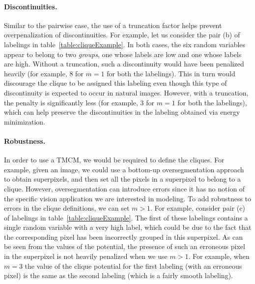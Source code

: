 \documentclass[10pt,letterpaper]{article}
\newcommand{\myparagraph}[1]{\vspace{0mm}\paragraph{#1}}
\begin{document}
\myparagraph{\bf Discontinuities.} Similar to the pairwise case, the use of a truncation factor helps prevent overpenalization of discontinuities. For example,
let us consider the pair (b) of labelings in table~\ref{table:cliqueExample}. In both cases, the six random variables appear to belong to two
{\em groups}, one whose labels are low and one whose labels are high. Without a truncation, such a discontinuity would have been penalized heavily (for example,
8 for $m=1$ for both the labelings). This in turn would discourage the clique to be assigned this labeling even though this type of discontinuity is expected
to occur in natural images. However, with a truncation, the penalty is significantly less (for example, 3 for $m=1$ for both the labelings), which can help
preserve the discontinuities in the labeling obtained via energy minimization.
\vspace{-1mm}

\myparagraph{\bf Robustness.} In order to use a TMCM, we would be required to define the cliques. For example, given an image, we could use a bottom-up oversegmentation
approach to obtain superpixels, and then set all the pixels in a superpixel to belong to a clique. However, oversegmentation can introduce errors since it has
no notion of the specific vision application we are interested in modeling. To add robustness to errors in the clique definitions, we can set $m > 1$.
For example, consider pair (c) of labelings in table~\ref{table:cliqueExample}. The first of these labelings contains a single
random variable with a very high label, which could be due to the fact that the corresponding pixel has been incorrectly grouped in this superpixel. 
As can be seen from the values of the potential, the
presence of such an erroneous pixel in the superpixel is not heavily penalized when we use $m > 1$. For example, when $m=3$ the value of the clique potential for
the first labeling (with an erroneous pixel) is the same as the second labeling (which is a fairly smooth labeling).
\end{document}
